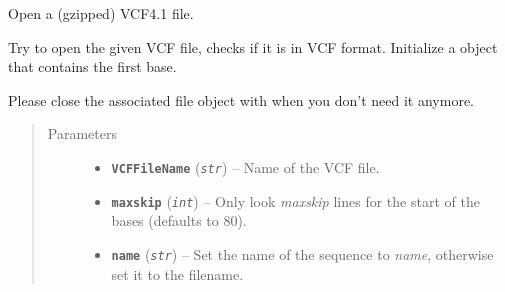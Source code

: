 \documentclass[letterpaper,10pt,english]{sphinxmanual}
\begin{document}
\begin{fulllineitems}
\label{vcf:libPoMo.vcf.init_seq}
Open a (gzipped) VCF4.1 file.

Try to open the given VCF file, checks if it is in VCF format.
Initialize a {\hyperref[vcf:libPoMo.vcf.VCFStream]{}} object that contains the first
base.

Please close the associated file object with
{\hyperref[vcf:libPoMo.vcf.VCFStream.close]{}} when you don't need it anymore.
\begin{quote}\begin{description}
\item[{Parameters}] \leavevmode\begin{itemize}
\item {} 
\textbf{\texttt{VCFFileName}} (\emph{\texttt{str}}) -- Name of the VCF file.

\item {} 
\textbf{\texttt{maxskip}} (\emph{\texttt{int}}) -- Only look \emph{maxskip} lines for the start of the
bases (defaults to 80).

\item {} 
\textbf{\texttt{name}} (\emph{\texttt{str}}) -- Set the name of the sequence to \emph{name}, otherwise
set it to the filename.

\end{itemize}

\end{description}\end{quote}

\end{fulllineitems}

\end{document}
